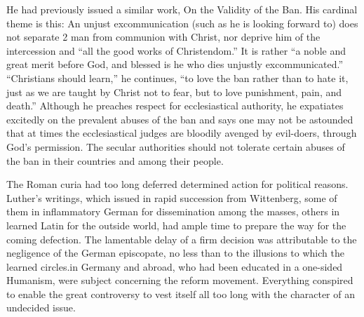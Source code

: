 He had previously issued a similar
work, On the Validity of the Ban. His cardinal theme is this: An
unjust excommunication (such as he is looking forward to) does not
separate 2 man from communion with Christ, nor deprive him of
the intercession and “all the good works of Christendom.” It is rather
“a noble and great merit before God, and blessed is he who dies unjustly
excommunicated.” “Christians should learn,” he continues,
“to love the ban rather than to hate it, just as we are taught by
Christ not to fear, but to love punishment, pain, and death.” Although
he preaches respect for ecclesiastical authority, he expatiates
excitedly on the prevalent abuses of the ban and says one may not
be astounded that at times the ecclesiastical judges are bloodily
avenged by evil-doers, through God’s permission. The secular authorities
should not tolerate certain abuses of the ban in their countries
and among their people.

The Roman curia had too long deferred determined action for
political reasons. Luther’s writings, which issued in rapid succession
from Wittenberg, some of them in inflammatory German for dissemination
among the masses, others in learned Latin for the outside
world, had ample time to prepare the way for the coming defection.
The lamentable delay of a firm decision was attributable to the negligence
of the German episcopate, no less than to the illusions to which
the learned circles.in Germany and abroad, who had been educated in
a one-sided Humanism, were subject concerning the reform movement.
Everything conspired to enable the great controversy to vest
itself all too long with the character of an undecided issue.

